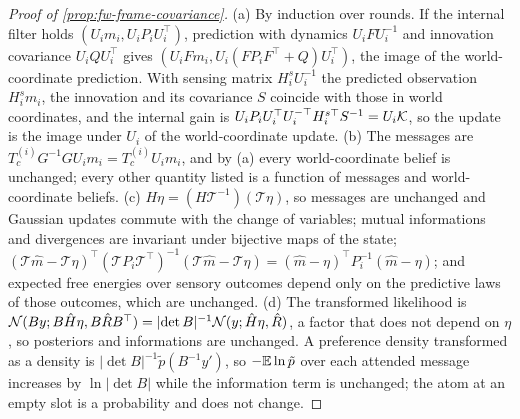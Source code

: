 \begin{proof}[Proof of \cref{prop:fw-frame-covariance}]
(a) By induction over rounds. If the internal filter holds $(U_im_i,U_iP_iU_i^\top)$, prediction with dynamics $U_iFU_i^{-1}$ and innovation covariance $U_iQU_i^\top$ gives $(U_iFm_i,U_i(FP_iF^\top+Q)U_i^\top)$, the image of the world-coordinate prediction. With sensing matrix $H^s_iU_i^{-1}$ the predicted observation $H^s_im_i$, the innovation and its covariance $S$ coincide with those in world coordinates, and the internal gain is $U_iP_iU_i^\top U_i^{-\top}H^{s\top}_iS^{-1}=U_i\mathcal{K}$, so the update is the image under $U_i$ of the world-coordinate update. (b) The messages are $T^{(i)}_cG^{-1}GU_im_i=T^{(i)}_cU_im_i$, and by (a) every world-coordinate belief is unchanged; every other quantity listed is a function of messages and world-coordinate beliefs. (c) $H\eta=(H\mathcal T^{-1})(\mathcal T\eta)$, so messages are unchanged and Gaussian updates commute with the change of variables; mutual informations and divergences are invariant under bijective maps of the state; $(\mathcal T\hat m-\mathcal T\eta)^\top(\mathcal TP_i\mathcal T^\top)^{-1}(\mathcal T\hat m-\mathcal T\eta)=(\hat m-\eta)^\top P_i^{-1}(\hat m-\eta)$; and expected free energies over sensory outcomes depend only on the predictive laws of those outcomes, which are unchanged. (d) The transformed likelihood is $\mathcal{N}(By;B\hat H\eta,B\hat RB^\top)=\lvert\det B\rvert^{-1}\mathcal{N}(y;\hat H\eta,\hat R)$, a factor that does not depend on $\eta$, so posteriors and informations are unchanged. A preference density transformed as a density is $\lvert\det B\rvert^{-1}\tilde p(B^{-1}y')$, so $-\mathbb{E}\ln\tilde p$ over each attended message increases by $\ln\lvert\det B\rvert$ while the information term is unchanged; the atom at an empty slot is a probability and does not change.
\end{proof}

